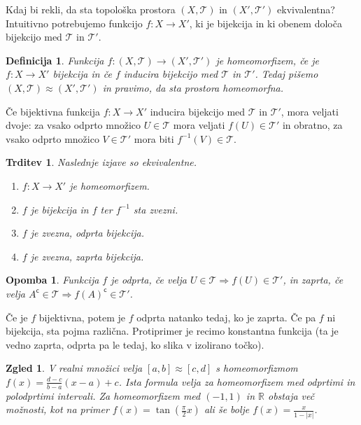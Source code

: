 \documentclass[10pt, a4paper]{article}
\newtheorem{trditev}[izr]{Trditev}
\newtheorem{defi}{Definicija}[section]
\newenvironment{noticeB}{%
  \tcolorbox[%
  notitle,
  empty,
  enhanced,  %
  breakable,
  coltext=black,
  colback=white, 
  fontupper=\rmfamily,
  parbox=false,
  noparskip,
  sharp corners,
  boxrule=-1pt,  %
  frame hidden,
  left=7pt,  %
  right=7pt,
  top=5pt,
  bottom=5pt,
  before skip=2.5ex plus 2pt,
  after skip=2.5ex plus 2pt,
  borderline west = {1.5pt}{-0.1pt}{blue!30!black}, %
  overlay unbroken and last={%
    \draw[color=black, line width=1.25pt]
    ($(frame.south west)+(1.pt, -0.1pt)$) -- ++(2em, 0);
  }
  ]}
{\endtcolorbox}
\newenvironment{definicija}{\begin{noticeB}\begin{defi}}{%
    \end{defi}\end{noticeB}}
\newtheorem*{opomba}{Opomba}
\newtheorem{zgled}{Zgled}[section]
\newcommand{\stcomp}[1]{{#1}^{\mathsf{c}}}
\newcommand{\R}{\mathbb {R}}
\newcommand{\topo}[1]{\mathcal{#1}}
\begin{document}
Kdaj bi rekli, da sta topološka prostora $(X, \mathcal{T})$ in $(X', \mathcal{T}')$ ekvivalentna?
Intuitivno potrebujemo funkcijo $f: X \to X'$, ki je bijekcija in ki obenem določa bijekcijo med 
$\mathcal{T}$ in $\mathcal{T}'$.

\begin{definicija}
  Funkcija $f: (X, \mathcal{T}) \to (X', \mathcal{T}')$ je homeomorfizem, če je $f: X \to X'$ bijekcija
  in če $f$ inducira bijekcijo med $\mathcal{T}$ in $\mathcal{T}'$. Tedaj pišemo $(X, \mathcal{T}) \approx (X', \mathcal{T}')$
  in pravimo, da sta prostora homeomorfna.
\end{definicija}

Če bijektivna funkcija $f: X \to X'$ inducira bijekcijo med $\mathcal{T}$ in $\mathcal{T}'$, mora veljati dvoje:
za vsako odprto množico $U \in \mathcal{T}$ mora veljati $f(U) \in \topo{T}'$ in obratno, 
za vsako odprto množico $V \in \topo{T}'$ mora biti $f^{-1} (V) \in \topo{T}$. 

\begin{trditev}
  Naslednje izjave so ekvivalentne.
  \begin{enumerate}
    \item $f: X \to X'$ je homeomorfizem.
    \item $f$ je bijekcija in $f$ ter $f^{-1}$ sta zvezni.
    \item $f$ je zvezna, odprta bijekcija.
    \item $f$ je zvezna, zaprta bijekcija.
  \end{enumerate}
\end{trditev}

\begin{opomba}
  Funkcija $f$ je odprta, če velja $U \in \mathcal{T} \Rightarrow f(U) \in \mathcal{T}'$, in 
  zaprta, če velja $\stcomp{A} \in \mathcal{T} \Rightarrow \stcomp{f(A)} \in \mathcal{T}'$.
\end{opomba}

Če je $f$ bijektivna, potem je $f$ odprta natanko tedaj, ko je zaprta.
Če pa $f$ ni bijekcija, sta pojma različna. Protiprimer je recimo konstantna funkcija (ta je vedno zaprta, odprta pa le tedaj,
ko slika v izolirano točko).

\begin{zgled}
  V realni množici velja $[a, b] \approx [c, d]$ s homeomorfizmom $f(x) = \frac{d - c}{b - a}(x-a) + c$.
  Ista formula velja za homeomorfizem med odprtimi in polodprtimi intervali. Za homeomorfizem med $(-1, 1)$ in $\R$
  obstaja več možnosti, kot na primer $f(x) = \tan \left(\frac{\pi}{2} x\right)$ ali še bolje $f(x) = \frac{x}{1 - |x|}$.
\end{zgled}
\end{document}
